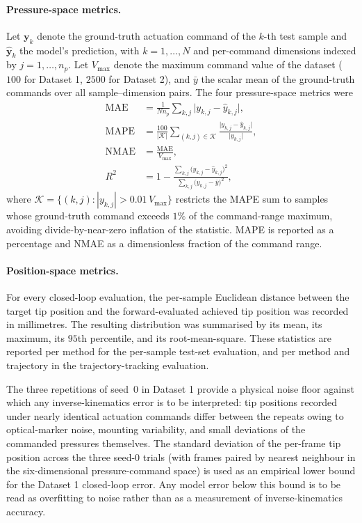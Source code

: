 \paragraph{Pressure-space metrics.}
Let $\mathbf{y}_k$ denote the ground-truth actuation command of the $k$-th test sample and $\hat{\mathbf{y}}_k$ the model's prediction, with $k = 1, \ldots, N$ and per-command dimensions indexed by $j = 1, \ldots, n_p$. Let $V_{\max}$ denote the maximum command value of the dataset ($100$ for Dataset 1, $2500$ for Dataset 2), and $\bar{y}$ the scalar mean of the ground-truth commands over all sample--dimension pairs. The four pressure-space metrics were
\begin{align}
  \mathrm{MAE}  &= \frac{1}{N n_p} \sum_{k, j} \bigl| y_{k,j} - \hat{y}_{k,j} \bigr|, \label{eq:mae} \\
  \mathrm{MAPE} &= \frac{100}{|\mathcal{K}|} \sum_{(k, j) \in \mathcal{K}} \frac{\bigl| y_{k,j} - \hat{y}_{k,j} \bigr|}{\bigl| y_{k,j} \bigr|}, \label{eq:mape} \\
  \mathrm{NMAE} &= \frac{\mathrm{MAE}}{V_{\max}}, \label{eq:nmae} \\
  R^{2}         &= 1 - \frac{\sum_{k, j} \bigl( y_{k,j} - \hat{y}_{k,j} \bigr)^{2}}{\sum_{k, j} \bigl( y_{k,j} - \bar{y} \bigr)^{2}}, \label{eq:r2}
\end{align}
where $\mathcal{K} = \{(k, j) : |y_{k,j}| > 0.01 \, V_{\max}\}$ restricts the MAPE sum to samples whose ground-truth command exceeds $1\%$ of the command-range maximum, avoiding divide-by-near-zero inflation of the statistic. MAPE is reported as a percentage and NMAE as a dimensionless fraction of the command range.

\paragraph{Position-space metrics.}
For every closed-loop evaluation, the per-sample Euclidean distance between the target tip position and the forward-evaluated achieved tip position was recorded in millimetres. The resulting distribution was summarised by its mean, its maximum, its $95$th percentile, and its root-mean-square. These statistics are reported per method for the per-sample test-set evaluation, and per method and trajectory in the trajectory-tracking evaluation.

The three repetitions of seed~0 in Dataset 1 provide a physical noise floor against which any inverse-kinematics error is to be interpreted: tip positions recorded under nearly identical actuation commands differ between the repeats owing to optical-marker noise, mounting variability, and small deviations of the commanded pressures themselves. The standard deviation of the per-frame tip position across the three seed-0 trials (with frames paired by nearest neighbour in the six-dimensional pressure-command space) is used as an empirical lower bound for the Dataset 1 closed-loop error. Any model error below this bound is to be read as overfitting to noise rather than as a measurement of inverse-kinematics accuracy.

